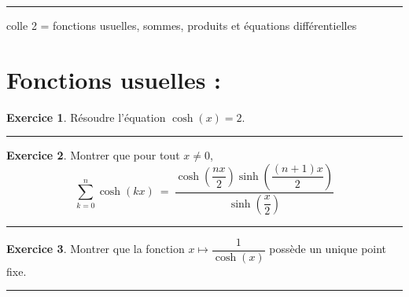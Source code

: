 \documentclass[10pt,a4paper]{article}
\newcommand{\R}{\mathbb{R}}
\theoremstyle{definition}
\theoremstyle{definition}
\newtheorem{exo}{Exercice}
\begin{document}
	
	\rule[0.5ex]{\textwidth}{0.1mm}	
	
	\begin{center}
		\Large \sc colle 2 = fonctions usuelles, sommes, produits et équations différentielles	
	\end{center}
	
\section*{Fonctions usuelles :}

\begin{center}
\begin{minipage}[t]{0.47\linewidth}
\raggedright

\begin{exo}
Résoudre l'équation $\cosh(x)=2$.
\end{exo}
\begin{center}
\rule{1\linewidth}{0.6pt}
\end{center}

\begin{exo}
Montrer que pour tout $x\neq 0$,
$$\sum\limits_{k=0}^{n} \cosh(kx) \ = \ \dfrac{\cosh\left(\dfrac{nx}{2}\right)\sinh\left(\dfrac{(n+1)x}{2}\right)}{\sinh\left(\dfrac{x}{2}\right)}$$
\end{exo}
\begin{center}
\rule{1\linewidth}{0.6pt}
\end{center}

\begin{exo}
Montrer que la fonction 
$x \longmapsto \dfrac{1}{\cosh(x)}$ possède un unique point fixe.
\end{exo}

\begin{center}
\rule{1\linewidth}{0.6pt}
\end{center}




\end{minipage}	
\hfill\vrule\hfill
\begin{minipage}[t]{0.47\linewidth}
\raggedright


\end{minipage}
\end{center}
\end{document}
